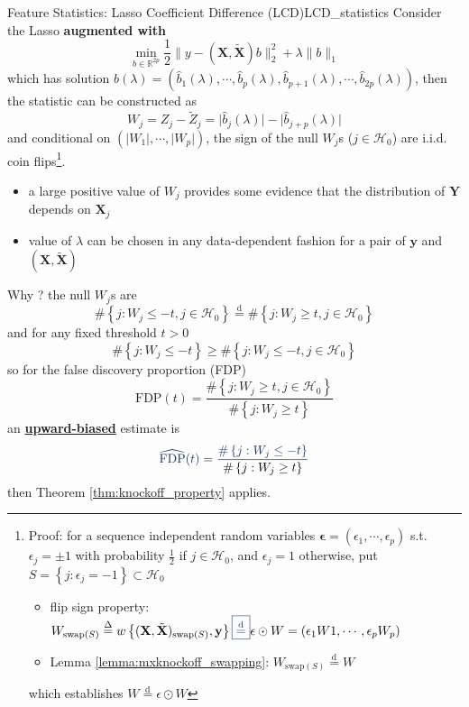\documentclass[twoside]{article}
\begin{document}
\begin{lemma}{Feature Statistics: Lasso Coefficient Difference (LCD)}{LCD_statistics}
    Consider the Lasso \textbf{{augmented with }} 
    $$
    \min_{b\in\mathbb{R}^{2p}}\frac{1}{2}\lVert y - (\mathbf{X},\tilde{\mathbf{X}})b \rVert^2_2 + \lambda \lVert b \rVert _1
    $$
    which has solution $ \hat{b}(\lambda) = (\hat{b}_1(\lambda),\cdots,\hat{b}_p(\lambda),\hat{b}_{p+1}(\lambda),\cdots,\hat{b}_{2p}(\lambda)) $, then the statistic can be constructed as 
    $$
    W_j = Z_j -\tilde{Z}_j = \lvert \hat{b}_j(\lambda) \rvert - \lvert \hat{b}_{j+p}(\lambda) \rvert
    $$
    and conditional on $\left( \lvert W_1 \rvert,\cdots, \lvert W_p \rvert \right)$, the sign of the null $W_j$s ($j\in \mathcal{H}_0$) are i.i.d. coin flips\footnote{Proof: for a sequence independent random variables $\boldsymbol{\epsilon}=(\epsilon_1,\cdots,\epsilon_p)$ s.t. $\epsilon_j = \pm 1$ with probability $\frac{1}{2}$ if $j\in\mathcal{H}_0$, and $\epsilon_j=1$ otherwise, put $S=\left\{j:\epsilon_j=-1\right\}\subset \mathcal{H}_0$
    \begin{itemize}
        \item flip sign property: $W_{\mathrm{swap}(S)} \overset{\Delta}{=}w \left\{ (\mathbf{X},\tilde{\mathbf{X}})_{\mathrm{swap}(S)},\mathbf{y} \right\} \textcolor{myblue}{\boxed{\overset{\mathrm{d}}{=}}} \epsilon \odot W = (\epsilon_1W1,\cdots,\epsilon_pW_p)$
        \item Lemma \ref{lemma:mxknockoff_swapping}: $W_{\mathrm{swap}(S)}\overset{\mathrm{d}}{=} W$
    \end{itemize}
    which establishes $W \overset{\mathrm{d}}{=} \epsilon \odot W $ }.
\end{lemma}
\begin{itemize}
    \item a large positive value of $W_j$ provides some evidence that the distribution of $\mathbf{Y}$ depends on $\mathbf{X}_j$
    \item value of $\lambda$ can be chosen in any data-dependent fashion for a pair of $\mathbf{y}$ and $(\mathbf{X},\tilde{\mathbf{X}})$ 
\end{itemize}

Why ? the null $W_j$s are 
$$
 \# \left\{ j: W_j\leq -t,j\in\mathcal{H}_0  \right\} \overset{\mathrm{d}}{=} \# \left\{ j: W_j\geq t,j\in\mathcal{H}_0  \right\}
$$
and for any fixed threshold $t>0$
$$
\# \left\{ j:W_j\leq -t \right\} \geq \# \left\{ j: W_j\leq -t,j\in\mathcal{H}_0  \right\}
$$
so for the false discovery proportion (FDP)
$$
{\mathrm{FDP}(t)} = \frac{ {\#\left\{j: W_j\geq t,j\in\mathcal{H}_0 \right\}} }{ \#\left\{ j:W_j\geq t \right\} }
$$
an \underline{\textbf{{upward-biased}}} estimate is
$$
{\textcolor{myblue}{\widehat{\mathrm{FDP}}(t)}} = \frac{ {\textcolor{myblue}{\# \left\{j: W_j\leq -t \right\}} } }{ \#\left\{ j:W_j\geq t \right\} }
$$
then Theorem \ref{thm:knockoff_property} applies.
\end{document}
